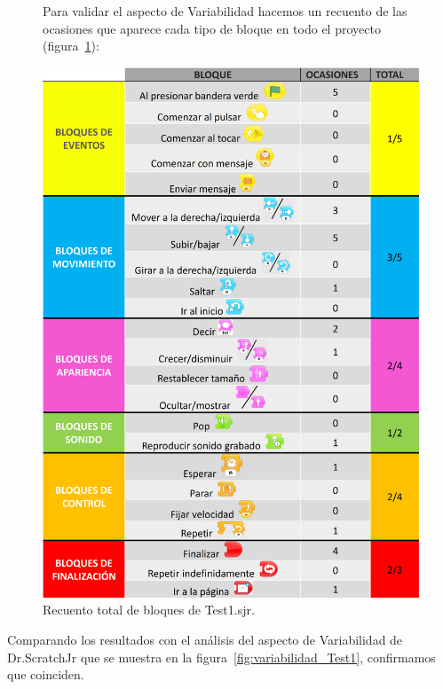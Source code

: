 \documentclass[a4paper, 12pt]{book}
\begin{document}
\begin{figure}[H]
Para validar el aspecto de Variabilidad hacemos un recuento de las ocasiones que aparece cada tipo de bloque en todo el proyecto (figura~\ref{fig:tabla_recuento}):\newline

  \includegraphics[width=15cm, keepaspectratio]{img/tabla_recuento.png}\centering
  \caption{Recuento total de bloques de Test1.sjr.}
  \label{fig:tabla_recuento}
\end{figure}

Comparando los resultados con el análisis del aspecto de Variabilidad de Dr.ScratchJr que se muestra en la figura~\ref{fig:variabilidad_Test1}, confirmamos que coinciden.
\end{document}
